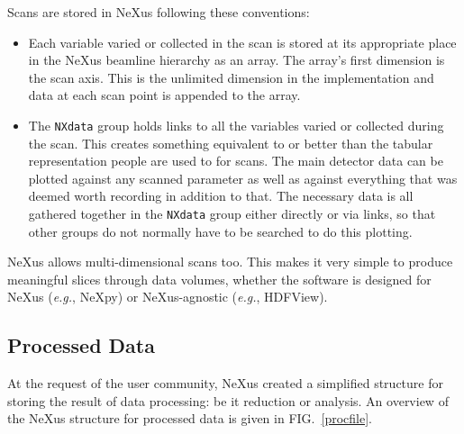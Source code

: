 \documentclass[%
 aip,
rsi,
 amsmath,amssymb,
 reprint,%
]{revtex4-1}
\begin{document}
Scans are stored in NeXus following these conventions: 
\begin{itemize}
\item Each variable varied or collected in the scan is stored at its appropriate place in the NeXus beamline 
 hierarchy as an array. The array's first dimension is the scan axis. This is the unlimited dimension in 
 the implementation and data at each scan point is appended to the array. 
\item The \texttt{NXdata} group holds links to all the variables varied or collected during the scan. 
 This creates something equivalent to or better than the tabular representation people are used to for scans. 
 The main detector data can be plotted against any scanned parameter as well as against everything that was 
 deemed worth recording in addition to that.  The necessary data is all gathered together in the \texttt{NXdata}
 group either directly or via links, so that other groups do not
 normally have to be searched to do this plotting.
 
\end{itemize}

NeXus allows multi-dimensional scans too. This makes it very simple to produce meaningful slices through data 
volumes, whether the software is designed for NeXus (\emph{e.g.}, NeXpy\cite{nexpy}) or NeXus-agnostic
 (\emph{e.g.}, HDFView\cite{hdfview}). 



\subsection{Processed Data}

At the request of the user community, NeXus created a simplified structure for storing the result of data 
processing: be it reduction or analysis. 
An overview of the NeXus structure for processed data is given in FIG.~\ref{procfile}. 
\end{document}
